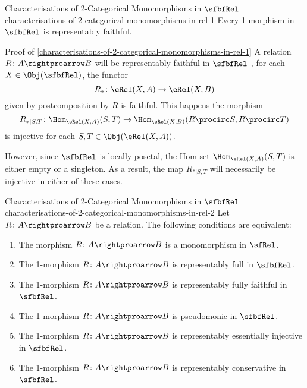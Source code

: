 \begin{proposition}{Characterisations of 2-Categorical Monomorphisms in $\sfbfRel$ \rmI}{characterisations-of-2-categorical-monomorphisms-in-rel-1}%
    Every 1-morphism in $\sfbfRel$ is representably faithful.
\end{proposition}
\begin{Proof}{Proof of \cref{characterisations-of-2-categorical-monomorphisms-in-rel-1}}%
    A relation $R\colon A\rightproarrow B$ will be representably faithful in $\sfbfRel$ \textiff, for each $X\in\Obj(\sfbfRel)$, the functor
    \[
        R_{*}%
        \colon%
        \eRel(X,A)%
        \to%
        \eRel(X,B)%
    \]%
    given by postcomposition by $R$ is faithful. This happens \textiff the morphism
    \[
        R_{*|S,T}%
        \colon%
        \Hom_{\eRel(X,A)}(S,T)%
        \to%
        \Hom_{\eRel(X,B)}(R\procirc S,R\procirc T)%
    \]%
    is injective for each $S,T\in\Obj(\eRel(X,A))$.

    \indent However, since $\sfbfRel$ is locally posetal, the Hom-set $\Hom_{\eRel(X,A)}(S,T)$ is either empty or a singleton. As a result, the map $R_{*|S,T}$ will necessarily be injective in either of these cases.
\end{Proof}
\begin{proposition}{Characterisations of 2-Categorical Monomorphisms in $\sfbfRel$ \rmII}{characterisations-of-2-categorical-monomorphisms-in-rel-2}%
    Let $R\colon A\rightproarrow B$ be a relation. The following conditions are equivalent:
    \begin{enumerate}
        \item\label{characterisations-of-2-categorical-monomorphisms-in-rel-2-1}The morphism $R\colon A\rightproarrow B$ is a monomorphism in $\sfRel$.
        \item\label{characterisations-of-2-categorical-monomorphisms-in-rel-2-2}The 1-morphism $R\colon A\rightproarrow B$ is representably full in $\sfbfRel$.
        \item\label{characterisations-of-2-categorical-monomorphisms-in-rel-2-3}The 1-morphism $R\colon A\rightproarrow B$ is representably fully faithful in $\sfbfRel$.
        \item\label{characterisations-of-2-categorical-monomorphisms-in-rel-2-4}The 1-morphism $R\colon A\rightproarrow B$ is pseudomonic in $\sfbfRel$.
        \item\label{characterisations-of-2-categorical-monomorphisms-in-rel-2-5}The 1-morphism $R\colon A\rightproarrow B$ is representably essentially injective in $\sfbfRel$.
        \item\label{characterisations-of-2-categorical-monomorphisms-in-rel-2-6}The 1-morphism $R\colon A\rightproarrow B$ is representably conservative in $\sfbfRel$.
    \end{enumerate}
\end{proposition}
